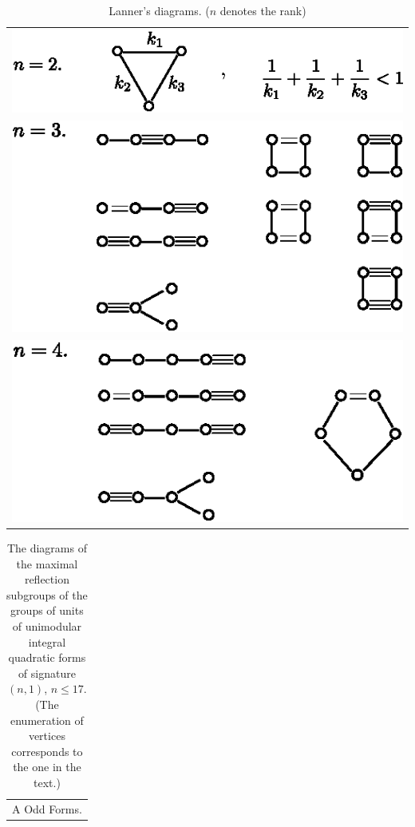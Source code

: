 \begin{enumerate}
{
\renewcommand{\arraystretch}{1.2}
\tabcolsep=10pt
\begin{longtable}{@{}l@{}}
\caption{Lanner's diagrams. ($n$ denotes the rank)}\\
 {\includegraphics{345b.eps}}\\
 {\includegraphics{345c.eps}}\\
{\includegraphics{345d.eps}}
\end{longtable}}\relax

{
\renewcommand{\arraystretch}{1.2}
\tabcolsep=10pt
\begin{longtable}{@{}l@{}}
\caption{The diagrams of the maximal reflection subgroups of the groups of units of unimodular integral quadratic forms of signature $(n,1)$, $n \leqslant 17$. (The enumeration of vertices corresponds to the one in the text.)}\\
A Odd Forms. \\
\end{longtable}}\relax


\end{enumerate}
